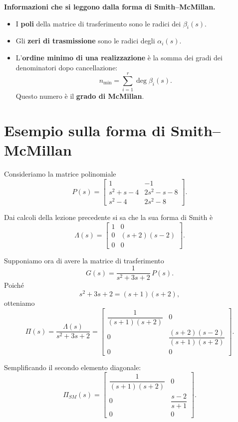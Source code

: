\medskip

\noindent
\textbf{Informazioni che si leggono dalla forma di Smith--McMillan.}
\begin{itemize}
    \item I \textbf{poli} della matrice di trasferimento sono le radici dei \(\beta_i(s)\).
    \item Gli \textbf{zeri di trasmissione} sono le radici degli \(\alpha_i(s)\).
    \item L'\textbf{ordine minimo di una realizzazione} è la somma dei gradi dei denominatori dopo cancellazione:
    \[
    n_{\min}=\sum_{i=1}^r \deg \beta_i(s).
    \]
    Questo numero è il \textbf{grado di McMillan}.
\end{itemize}

\bigskip

\section{Esempio sulla forma di Smith--McMillan}

Consideriamo la matrice polinomiale
\[
P(s)=
\begin{bmatrix}
1 & -1\\
s^2+s-4 & 2s^2-s-8\\
s^2-4 & 2s^2-8
\end{bmatrix}.
\]

Dai calcoli della lezione precedente si sa che la sua forma di Smith è
\[
\Lambda(s)=
\begin{bmatrix}
1 & 0\\
0 & (s+2)(s-2)\\
0 & 0
\end{bmatrix}.
\]

Supponiamo ora di avere la matrice di trasferimento
\[
G(s)=\frac{1}{s^2+3s+2}\,P(s).
\]
Poiché
\[
s^2+3s+2=(s+1)(s+2),
\]
otteniamo
\[
\Pi(s)=\frac{\Lambda(s)}{s^2+3s+2}
=
\begin{bmatrix}
\dfrac{1}{(s+1)(s+2)} & 0\\[1.1em]
0 & \dfrac{(s+2)(s-2)}{(s+1)(s+2)}\\[1.1em]
0 & 0
\end{bmatrix}.
\]

Semplificando il secondo elemento diagonale:
\[
\Pi_{SM}(s)=
\begin{bmatrix}
\dfrac{1}{(s+1)(s+2)} & 0\\[1.1em]
0 & \dfrac{s-2}{s+1}\\[1.1em]
0 & 0
\end{bmatrix}.
\]

